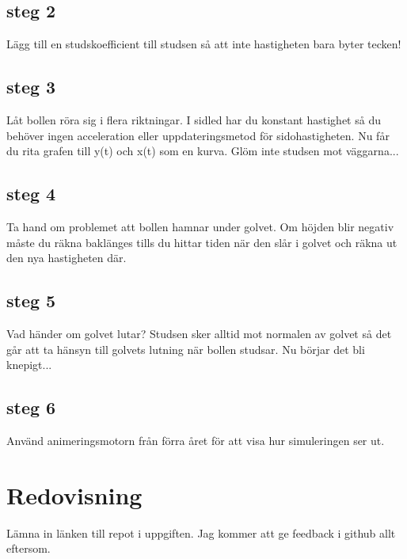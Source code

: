 \documentclass[11pt]{article}
\begin{document}
    \subsection{steg 2}
        Lägg till en studskoefficient till studsen så att inte hastigheten bara byter tecken!
    \subsection{steg 3}
        Låt bollen röra sig i flera riktningar. I sidled har du konstant hastighet så du behöver ingen acceleration eller
        uppdateringsmetod för sidohastigheten. Nu får du rita grafen till y(t) och x(t) som en kurva. Glöm inte studsen mot väggarna...
    \subsection{steg 4}
        Ta hand om problemet att bollen hamnar under golvet. Om höjden blir negativ måste du räkna baklänges tills du hittar
        tiden när den slår i golvet och räkna ut den nya hastigheten där.
    \subsection{steg 5}
        Vad händer om golvet lutar? Studsen sker alltid mot normalen av golvet så det går att ta hänsyn till golvets
        lutning när bollen studsar. Nu börjar det bli knepigt...
    \subsection{steg 6}
        Använd animeringsmotorn från förra året för att visa hur simuleringen ser ut.
\section{Redovisning}
    Lämna in länken till repot i uppgiften. Jag kommer att ge feedback i github allt eftersom.
\end{document}
